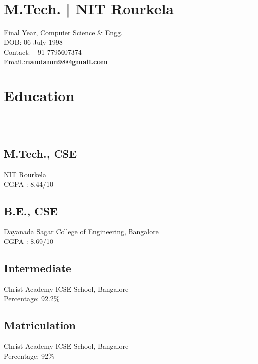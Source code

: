 \documentclass[]{rahulworld-resume}
\begin{document}
%
%

\begin{minipage}[t]{0.38\textwidth} 
\begin{large}
	\\
\end{large}
\section{M.Tech. | NIT Rourkela}
\vspace{0.2 cm}
Final Year, Computer Science \&  Engg.\\
DOB: 06 July 1998\\
Contact: +91 7795607374\\
Email.:\textbf{\href{mailto:nandanm98@gmail.com}{nandanm98@gmail.com}}
\section{Education} 
\noindent\rule{7cm}{0.4pt}\\
\subsection{M.Tech., CSE}
NIT Rourkela \\
CGPA : 8.44/10\\
\vspace{4pt}
\subsection{B.E., CSE}
Dayanada Sagar College of Engineering, Bangalore \\
CGPA : 8.69/10\\
\vspace{4pt}
\subsection{Intermediate}
Christ Academy ICSE School, Bangalore\\
Percentage: 92.2\%\\
\vspace{4pt}
\subsection{Matriculation}
Christ Academy ICSE School, Bangalore\\
Percentage: 92\%\\

\end{minipage}
\end{document}
